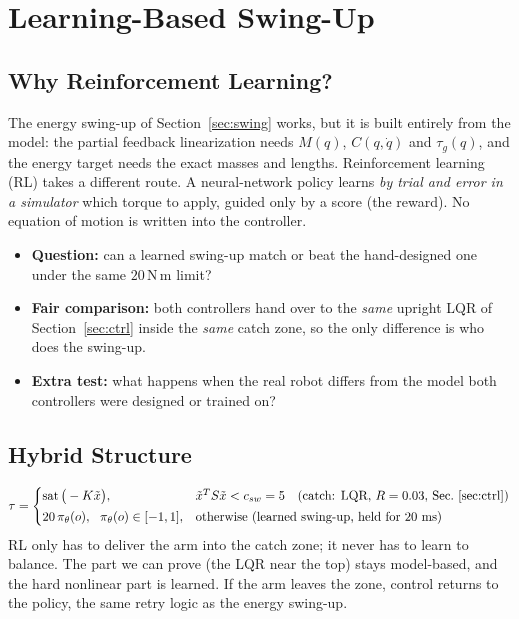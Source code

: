 \documentclass[12pt,a4paper]{article}
\newcommand{\Nm}{\,\mathrm{N\,m}}
\begin{document}
\section{Learning-Based Swing-Up}\label{sec:rl}

\subsection{Why Reinforcement Learning?}
The energy swing-up of Section~\ref{sec:swing} works, but it is built entirely from the model: the partial feedback linearization needs $M(q)$, $C(q,\dot q)$ and $\tau_g(q)$, and the energy target needs the exact masses and lengths. Reinforcement learning (RL) takes a different route. A neural-network policy learns \emph{by trial and error in a simulator} which torque to apply, guided only by a score (the reward). No equation of motion is written into the controller.
\begin{itemize}
\item \textbf{Question:} can a learned swing-up match or beat the hand-designed one under the same $20\Nm$ limit?
\item \textbf{Fair comparison:} both controllers hand over to the \emph{same} upright LQR of Section~\ref{sec:ctrl} inside the \emph{same} catch zone, so the only difference is who does the swing-up.
\item \textbf{Extra test:} what happens when the real robot differs from the model both controllers were designed or trained on?
\end{itemize}

\subsection{Hybrid Structure}
\begin{equation}
\tau=\begin{cases}\operatorname{sat}\big(-K\tilde x\big), & \tilde x^TS\tilde x<c_{sw}=5\quad\text{(catch: LQR, } R=0.03\text{, Sec.~\ref{sec:ctrl})}\\[2pt] 20\,\pi_\theta(o),\ \ \pi_\theta(o)\in[-1,1], & \text{otherwise (learned swing-up, held for 20 ms)}\end{cases}
\end{equation}
RL only has to deliver the arm into the catch zone; it never has to learn to balance. The part we can prove (the LQR near the top) stays model-based, and the hard nonlinear part is learned. If the arm leaves the zone, control returns to the policy, the same retry logic as the energy swing-up.
\end{document}
